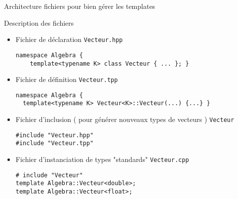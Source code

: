 \documentclass[handout,10pt]{beamer}
\begin{document}
\begin{frame}[fragile]{Architecture fichiers pour bien gérer les templates}
\tiny
\begin{minipage}{0.35\textwidth}
\end{minipage}\hfill
\begin{minipage}{0.63\textwidth}
\begin{block}{Description des fichiers}
\begin{itemize}
\item Fichier de déclaration \lstinline$Vecteur.hpp$
\begin{lstlisting}
namespace Algebra { 
    template<typename K> class Vecteur { ... }; }
\end{lstlisting}
\item Fichier de définition \lstinline$Vecteur.tpp$
\begin{lstlisting}
namespace Algebra {
  template<typename K> Vecteur<K>::Vecteur(...) {...} }
\end{lstlisting}
\item Fichier d'inclusion ( pour générer nouveaux types de vecteurs ) \lstinline$Vecteur$
\begin{lstlisting}
#include "Vecteur.hpp"
#include "Vecteur.tpp"
\end{lstlisting}
\item Fichier d'instanciation de types "standards" \lstinline$Vecteur.cpp$
\begin{lstlisting}
# include "Vecteur"
template Algebra::Vecteur<double>;
template Algebra::Vecteur<float>;
\end{lstlisting}
\end{itemize}
\end{block}
\end{minipage}
\end{frame}
\end{document}
